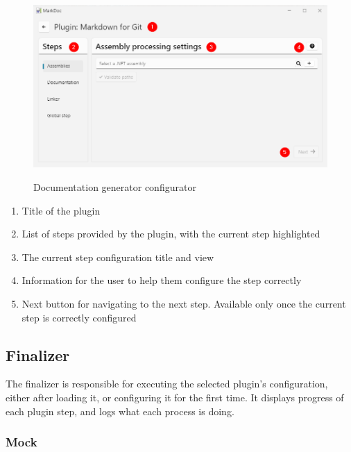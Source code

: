 \begin{figure}[H]
    \caption{Documentation generator configurator}
    \includegraphics[width=\linewidth]{img/markDocConfigurator.png}
    \label{fig:configuratorPage}
\end{figure}

\begin{enumerate}
    \item Title of the plugin
    \item List of steps provided by the plugin, with the current step highlighted
    \item The current step configuration title and view
    \item Information for the user to help them configure the step correctly
    \item Next button for navigating to the next step. Available only once the current step is correctly configured
\end{enumerate}

\subsection{Finalizer}

The finalizer is responsible for executing the selected plugin's configuration, either after loading it, or configuring it for the first time. It displays progress of each plugin step, and logs what each process is doing.

\subsubsection{Mock}

